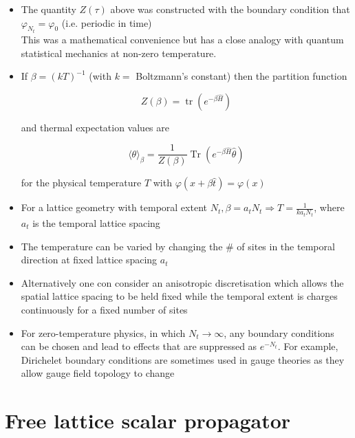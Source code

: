 \begin{itemize}
  \item The quantity \(Z(\tau)\) above was constructed with the boundary condition that \(\varphi_{N_{t}}=\varphi_{0}\) (i.e. periodic in time)\\
This was a mathematical convenience but has a close analogy with quantum statistical mechanics at non-zero temperature.
  \item If \(\beta=(k T)^{-1}\) (with \(k=\) Boltzmann's constant) then the partition function

\begin{equation}
Z(\beta)=\operatorname{tr}\left(e^{-\beta \hat H}\right)
\end{equation}

and thermal expectation values are

\begin{equation}
\langle\theta\rangle_{\beta}=\frac{1}{Z(\beta)} \operatorname{Tr}\left(e^{-\beta \hat{H}} \hat{\theta}\right)
\end{equation}

for the physical temperature \(T\) with \(\varphi(x+\beta \hat{t})=\varphi(x)\)

  \item For a lattice geometry with temporal extent \(N_{t}, \beta=a_{t} N_{t} \Rightarrow T=\frac{1}{k a_{t} N_{t}}\), where $a_t$ is the temporal lattice spacing
  \item The temperature can be varied by changing the \# of sites in the temporal direction at fixed lattice spacing \(a_{t}\)
  \item Alternatively one con consider an anisotropic discretisation which allows the spatial lattice spacing to be held fixed while the temporal extent is charges continuously for a fixed number of sites
  \item For zero-temperature physics, in which $N_t\to\infty$, any boundary conditions can be chosen and lead to effects that are suppressed as $e^{-N_t}$. For example, Dirichelet boundary conditions are sometimes used in gauge theories as they allow gauge field topology to change 
  
  \end{itemize}

\section{Free lattice scalar propagator}

